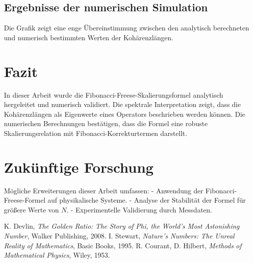 \documentclass[a4paper,12pt]{article}
\begin{document}
\subsection{Ergebnisse der numerischen Simulation}
Die Grafik zeigt eine enge Übereinstimmung zwischen den analytisch berechneten und numerisch bestimmten Werten der Kohärenzlängen.

\section{Fazit}
In dieser Arbeit wurde die Fibonacci-Freese-Skalierungsformel analytisch hergeleitet und numerisch validiert. Die spektrale Interpretation zeigt, dass die Kohärenzlängen als Eigenwerte eines Operators beschrieben werden können. Die numerischen Berechnungen bestätigen, dass die Formel eine robuste Skalierungsrelation mit Fibonacci-Korrekturtermen darstellt.

\section{Zukünftige Forschung}
Mögliche Erweiterungen dieser Arbeit umfassen:
- Anwendung der Fibonacci-Freese-Formel auf physikalische Systeme.
- Analyse der Stabilität der Formel für größere Werte von \( N \).
- Experimentelle Validierung durch Messdaten.

\begin{thebibliography}{9}
 K. Devlin, \textit{The Golden Ratio: The Story of Phi, the World's Most Astonishing Number}, Walker Publishing, 2008.
 I. Stewart, \textit{Nature's Numbers: The Unreal Reality of Mathematics}, Basic Books, 1995.
 R. Courant, D. Hilbert, \textit{Methods of Mathematical Physics}, Wiley, 1953.
\end{thebibliography}
\end{document}
